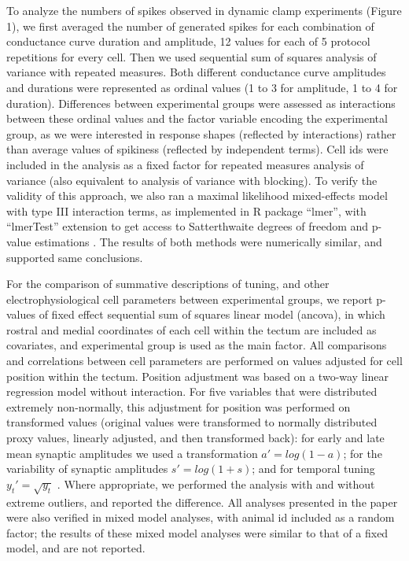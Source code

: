 \documentclass{article}
\begin{document}
To analyze the numbers of spikes observed in dynamic clamp experiments (Figure 1), we first averaged the number of generated spikes for each combination of conductance curve duration and amplitude, 12 values for each of 5 protocol repetitions for every cell. Then we used sequential sum of squares analysis of variance with repeated measures. Both different conductance curve amplitudes and durations were represented as ordinal values (1 to 3 for amplitude, 1 to 4 for duration). Differences between experimental groups were assessed as interactions between these ordinal values and the factor variable encoding the experimental group, as we were interested in response shapes (reflected by interactions) rather than average values of spikiness (reflected by independent terms). Cell ids were included in the analysis as a fixed factor for repeated measures analysis of variance (also equivalent to analysis of variance with blocking). To verify the validity of this approach, we also ran a maximal likelihood mixed-effects model with type III interaction terms, as implemented in R package “lmer”, with “lmerTest” extension to get access to Satterthwaite degrees of freedom and p-value estimations \citep{kuznetsova2017}. The results of both methods were numerically similar, and supported same conclusions.

For the comparison of summative descriptions of tuning, and other electrophysiological cell parameters between experimental groups, we report p-values of fixed effect sequential sum of squares linear model (ancova), in which rostral and medial coordinates of each cell within the tectum are included as covariates, and experimental group is used as the main factor. All comparisons and correlations between cell parameters are performed on values adjusted for cell position within the tectum. Position adjustment was based on a two-way linear regression model without interaction. For five variables that were distributed extremely non-normally, this adjustment for position was performed on transformed values (original values were transformed to normally distributed proxy values, linearly adjusted, and then transformed back): for early and late mean synaptic amplitudes we used a transformation $a'=log(1-a)$; for the variability of synaptic amplitudes $s'=log(1+s)$; and for temporal tuning $y_t' = \sqrt{y_t}$ . Where appropriate, we performed the analysis with and without extreme outliers, and reported the difference. All analyses presented in the paper were also verified in mixed model analyses, with animal id included as a random factor; the results of these mixed model analyses were similar to that of a fixed model, and are not reported.
\end{document}

